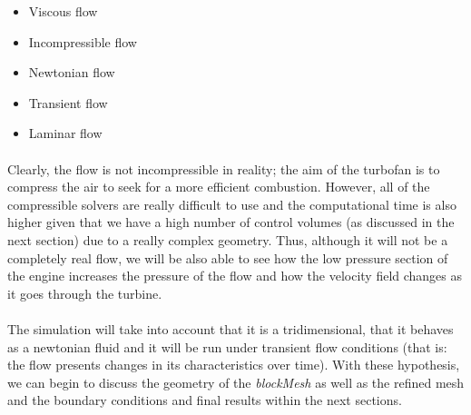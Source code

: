 \begin{itemize}
	\item Viscous flow
	\item Incompressible flow
	\item Newtonian flow
	\item Transient flow
	\item Laminar flow
\end{itemize}

\paragraph{}Clearly, the flow is not incompressible in reality; the aim of the turbofan is to compress the air to seek for a more efficient combustion. However, all of the compressible solvers are really difficult to use and the computational time is also higher given that we have a high number of control volumes (as discussed in the next section) due to a really complex geometry. Thus, although it will not be a completely real flow, we will be also able to see how the low pressure section of the engine increases the pressure of the flow and how the velocity field changes as it goes through the turbine.

\paragraph{}The simulation will take into account that it is a tridimensional, that it behaves as a newtonian fluid and it will be run under transient flow conditions (that is: the flow presents changes in its characteristics over time). With these hypothesis, we can begin to discuss the geometry of the \textit{blockMesh} as well as the refined mesh and the boundary conditions and final results within the next sections.